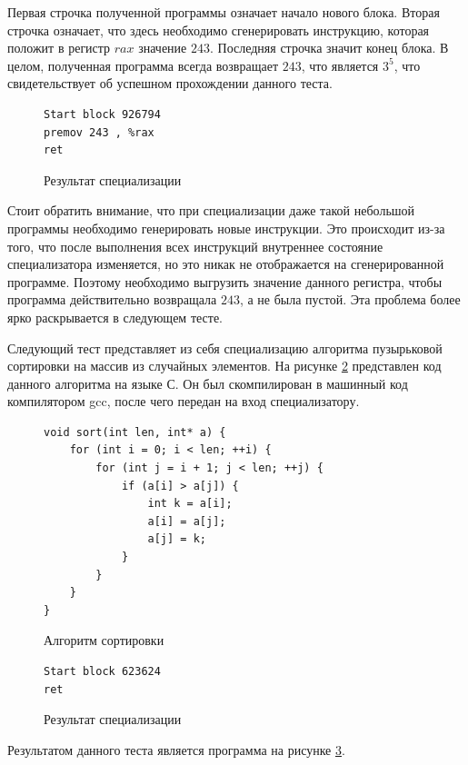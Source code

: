 Первая строчка полученной программы означает начало нового блока. Вторая строчка означает, что здесь необходимо сгенерировать инструкцию, которая положит в регистр $rax$ значение $243$. Последняя строчка значит конец блока. В целом, полученная программа всегда возвращает $243$, что является $3^5$, что свидетельствует об успешном прохождении данного теста. 

\begin{figure}
\begin{lstlisting}[xleftmargin = 20pt]
Start block 926794
premov 243 , %rax 
ret
\end{lstlisting}
\caption{ Результат специализации}
\label{fig:intres}
\end{figure}

Стоит обратить внимание, что при специализации даже такой небольшой программы необходимо генерировать новые инструкции. Это происходит из-за того, что после выполнения всех инструкций внутреннее состояние специализатора изменяется, но это никак не отображается на сгенерированной программе. Поэтому необходимо выгрузить значение данного регистра, чтобы программа действительно возвращала $243$, а не была пустой. Эта проблема более ярко раскрывается в следующем тесте.

Следующий тест представляет из себя специализацию алгоритма пузырьковой сортировки на массив из случайных элементов. На рисунке \ref{fig:sort} представлен код данного алгоритма на языке С. Он был скомпилирован в машинный код компилятором gcc, после чего передан на вход специализатору.
\begin{figure}[h]
\begin{lstlisting}[xleftmargin = 20pt]
void sort(int len, int* a) {
    for (int i = 0; i < len; ++i) {
        for (int j = i + 1; j < len; ++j) {
            if (a[i] > a[j]) {
                int k = a[i];
                a[i] = a[j];
                a[j] = k;
            }
        }
    }
}
\end{lstlisting}
\caption{ Алгоритм сортировки}
\label{fig:sort}
\end{figure}
\begin{figure}
\begin{lstlisting}[xleftmargin = 20pt]
Start block 623624
ret
\end{lstlisting}
\caption{ Результат специализации}
\label{fig:sortres}
\end{figure}
Результатом данного теста является программа на рисунке \ref{fig:sortres}.

